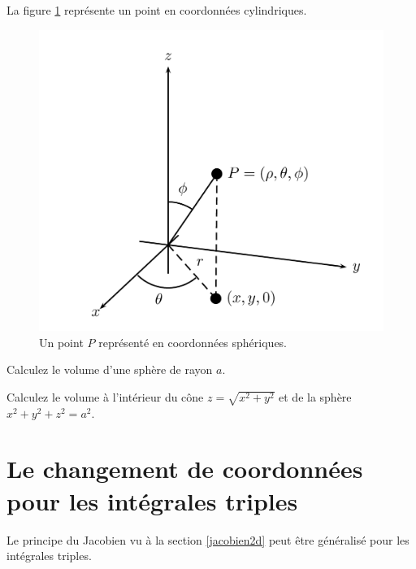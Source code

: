 \documentclass[]{book}
\theoremstyle{definition}
\theoremstyle{definition}
\theoremstyle{definition}
\theoremstyle{remark}
\let\BeginKnitrBlock\begin \let\EndKnitrBlock\end
\begin{document}
La figure \ref{fig:coordspheriques} représente un point en coordonnées
cylindriques.

\begin{figure}

{\centering \includegraphics[width=0.75\linewidth]{resources/images/latex/coordspheriques} 

}

\caption{Un point $P$ représenté en coordonnées sphériques.}\label{fig:coordspheriques}
\end{figure}

\BeginKnitrBlock{example}
\protect\hypertarget{exm:unnamed-chunk-286}{}{\label{exm:unnamed-chunk-286}
}Calculez le volume d'une sphère de rayon \(a\).
\EndKnitrBlock{example}
\vspace*{5cm}

\BeginKnitrBlock{example}
\protect\hypertarget{exm:unnamed-chunk-287}{}{\label{exm:unnamed-chunk-287}
}Calculez le volume à l'intérieur du cône \(z=\sqrt{x^2+y^2}\) et de la
sphère \(x^2+y^2+z^2=a^2\).
\EndKnitrBlock{example}
\vspace*{10cm}

\hypertarget{le-changement-de-coordonnees-pour-les-integrales-triples}{%
\section{Le changement de coordonnées pour les intégrales
triples}\label{le-changement-de-coordonnees-pour-les-integrales-triples}}

Le principe du Jacobien vu à la section \ref{jacobien2d} peut être
généralisé pour les intégrales triples.
\end{document}
